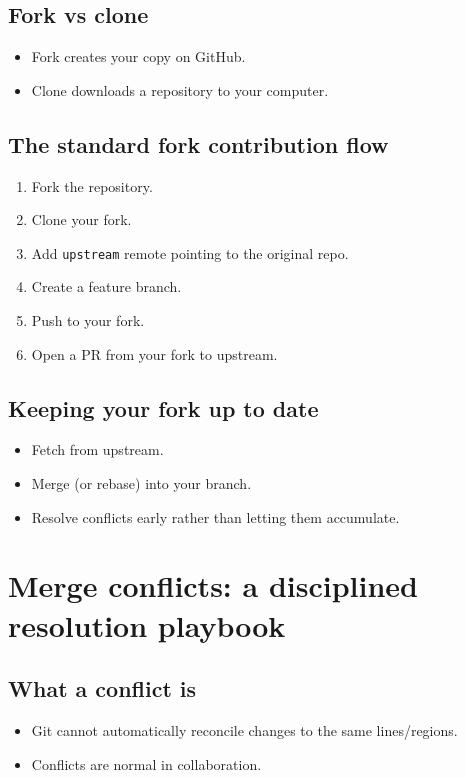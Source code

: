 \subsection{Fork vs clone}
\begin{itemize}
\item Fork creates your copy on GitHub.
\item Clone downloads a repository to your computer.
\end{itemize}

\subsection{The standard fork contribution flow}
\begin{enumerate}
\item Fork the repository.
\item Clone your fork.
\item Add \texttt{upstream} remote pointing to the original repo.
\item Create a feature branch.
\item Push to your fork.
\item Open a PR from your fork to upstream.
\end{enumerate}

\subsection{Keeping your fork up to date}
\begin{itemize}
\item Fetch from upstream.
\item Merge (or rebase) into your branch.
\item Resolve conflicts early rather than letting them accumulate.
\end{itemize}

\section{Merge conflicts: a disciplined resolution playbook}
\subsection{What a conflict is}
\begin{itemize}
\item Git cannot automatically reconcile changes to the same lines/regions.
\item Conflicts are normal in collaboration.
\end{itemize}

